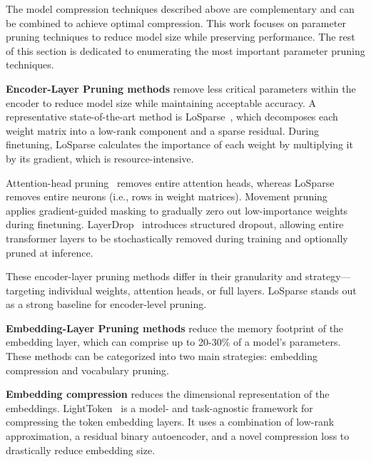 \documentclass[twocolumn]{article}
\begin{document}
The model compression techniques described above are complementary and can be combined to achieve optimal compression.
This work focuses on parameter pruning techniques to reduce model size while preserving performance. The rest of this section is dedicated to enumerating the most important parameter pruning techniques.


\textbf{Encoder-Layer Pruning methods} remove less critical parameters within the encoder to reduce model size while maintaining acceptable accuracy. A representative state-of-the-art method is LoSparse~\cite{li2023losparse}, which decomposes each weight matrix into a low-rank component and a sparse residual. During finetuning, LoSparse calculates the importance of each weight by multiplying it by its gradient, which is resource-intensive.

Attention-head pruning~\cite{michel2019sixteen} removes entire attention heads, whereas LoSparse removes entire neurons (i.e., rows in weight matrices). Movement pruning~\cite{sanh2020movement} applies gradient-guided masking to gradually zero out low-importance weights during finetuning. LayerDrop~\cite{fan2020layerdrop} introduces structured dropout, allowing entire transformer layers to be stochastically removed during training and optionally pruned at inference.

These encoder-layer pruning methods differ in their granularity and strategy—targeting individual weights, attention heads, or full layers. LoSparse stands out as a strong baseline for encoder-level pruning. ~\cite{pmlr-v235-li24bi}~\cite{huang2023awesome}~\cite{ren2025llmcompression}


\textbf{Embedding-Layer Pruning methods} reduce the memory footprint of the embedding layer, which can comprise up to 20-30\% of a model's parameters. These methods can be categorized into two main strategies: embedding compression and vocabulary pruning.

\textbf{Embedding compression} reduces the dimensional representation of the embeddings. LightToken~\cite{wang2023lighttoken} is a model- and task-agnostic framework for compressing the token embedding layers. It uses a combination of low-rank approximation, a residual binary autoencoder, and a novel compression loss to drastically reduce embedding size. 
\end{document}
